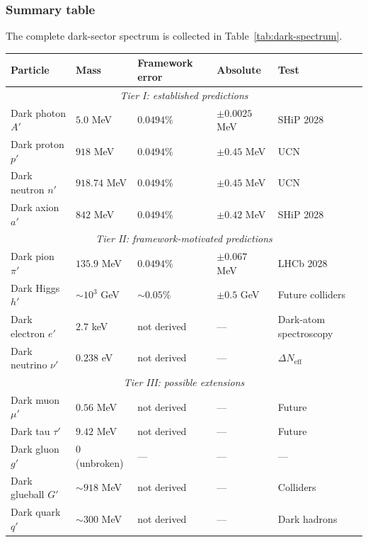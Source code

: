 \documentclass[12pt,oneside,openany]{book}
\begin{document}
\subsubsection{Summary table}

The complete dark-sector spectrum is collected in
Table~\ref{tab:dark-spectrum}.

\begin{table}[htbp]
\centering
\small
\renewcommand{\arraystretch}{1.3}
\begin{tabular}{@{}p{}p{}p{}p{}p{}@{}}
\toprule
Particle & Mass & Framework error & Absolute & Test \\
\midrule
\multicolumn{5}{c}{\textit{Tier I: established predictions}} \\
\midrule
Dark photon $A'$   & $5.0$ MeV        & $0.0494\%$ & $\pm 0.0025$ MeV & SHiP 2028 \\
Dark proton $p'$   & $918$ MeV        & $0.0494\%$ & $\pm 0.45$ MeV   & UCN \\
Dark neutron $n'$  & $918.74$ MeV     & $0.0494\%$ & $\pm 0.45$ MeV   & UCN \\
Dark axion $a'$    & $842$ MeV        & $0.0494\%$ & $\pm 0.42$ MeV   & SHiP 2028 \\
\midrule
\multicolumn{5}{c}{\textit{Tier II: framework-motivated predictions}} \\
\midrule
Dark pion $\pi'$   & $135.9$ MeV      & $0.0494\%$ & $\pm 0.067$ MeV  & LHCb 2028 \\
Dark Higgs $h'$    & $\sim 10^{3}$ GeV& $\sim 0.05\%$ & $\pm 0.5$ GeV & Future colliders \\
Dark electron $e'$ & $2.7$ keV        & not derived & ---           & Dark-atom spectroscopy \\
Dark neutrino $\nu'$ & $0.238$ eV     & not derived & ---           & $\Delta N_{\text{eff}}$ \\
\midrule
\multicolumn{5}{c}{\textit{Tier III: possible extensions}} \\
\midrule
Dark muon $\mu'$   & $0.56$ MeV       & not derived & ---           & Future \\
Dark tau $\tau'$   & $9.42$ MeV       & not derived & ---           & Future \\
Dark gluon $g'$    & $0$ (unbroken)   & ---         & ---           & --- \\
Dark glueball $G'$ & $\sim 918$ MeV   & not derived & ---           & Colliders \\
Dark quark $q'$    & $\sim 300$ MeV   & not derived & ---           & Dark hadrons \\

\end{tabular}
\end{table}
\end{document}
